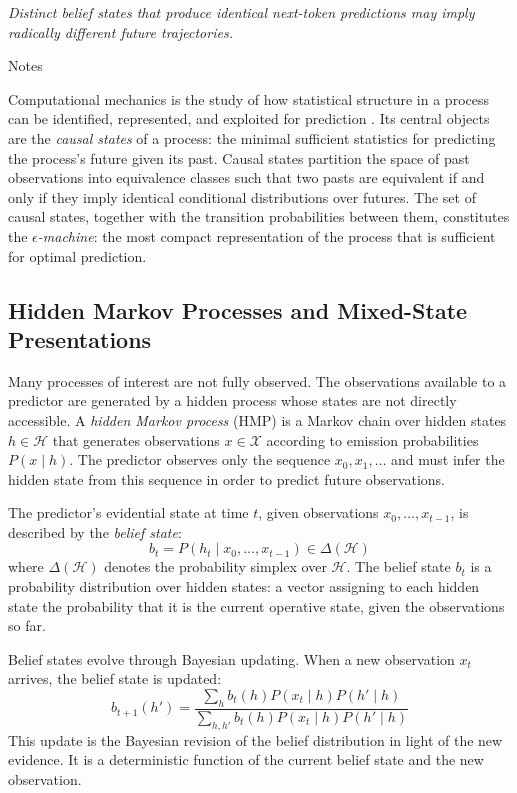 \documentclass[12pt, a4paper]{article}
\theoremstyle{plain}
\theoremstyle{definition}
\theoremstyle{remark}
\begin{document}
\epigraph{\textit{Distinct belief states that produce identical next-token
predictions may imply radically different future trajectories.}}{Notes}

\noindent
Computational mechanics is the study of how statistical structure in a
process can be identified, represented, and exploited for prediction
\citep{crutchfield1989,shalizi2001}. Its central objects are the
\emph{causal states} of a process: the minimal sufficient statistics for
predicting the process's future given its past. Causal states partition
the space of past observations into equivalence classes such that two
pasts are equivalent if and only if they imply identical conditional
distributions over futures. The set of causal states, together with the
transition probabilities between them, constitutes the
\emph{$\epsilon$-machine}: the most compact representation of the
process that is sufficient for optimal prediction.

\subsection{Hidden Markov Processes and Mixed-State Presentations}

Many processes of interest are not fully observed. The observations
available to a predictor are generated by a hidden process whose states
are not directly accessible. A \emph{hidden Markov process} (HMP) is a
Markov chain over hidden states $h \in \mathcal{H}$ that generates
observations $x \in \mathcal{X}$ according to emission probabilities
$P(x \mid h)$. The predictor observes only the sequence $x_0, x_1, \ldots$
and must infer the hidden state from this sequence in order to predict
future observations.

The predictor's evidential state at time $t$, given observations
$x_0, \ldots, x_{t-1}$, is described by the \emph{belief state}:
$$b_t = P(h_t \mid x_0, \ldots, x_{t-1}) \in \Delta(\mathcal{H})$$
where $\Delta(\mathcal{H})$ denotes the probability simplex over $\mathcal{H}$.
The belief state $b_t$ is a probability distribution over hidden states:
a vector assigning to each hidden state the probability that it is the
current operative state, given the observations so far.

Belief states evolve through Bayesian updating. When a new observation
$x_t$ arrives, the belief state is updated:
$$b_{t+1}(h') = \frac{\sum_h b_t(h) P(x_t \mid h) P(h' \mid h)}
{\sum_{h,h'} b_t(h) P(x_t \mid h) P(h' \mid h)}$$
This update is the Bayesian revision of the belief distribution in light
of the new evidence. It is a deterministic function of the current
belief state and the new observation.
\end{document}
